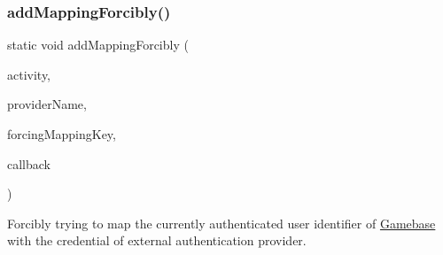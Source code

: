 \subsubsection{\texorpdfstring{add\+Mapping\+Forcibly()}{addMappingForcibly()}\hspace{0.1cm}{\footnotesize\ttfamily [1/3]}}
{\footnotesize\ttfamily static void add\+Mapping\+Forcibly (\begin{DoxyParamCaption}\item[{@Non\+Null final Activity}]{activity,  }\item[{@Non\+Null final String}]{provider\+Name,  }\item[{@Non\+Null final String}]{forcing\+Mapping\+Key,  }\item[{@Nullable final \hyperlink{interfacecom_1_1toast_1_1android_1_1gamebase_1_1_gamebase_data_callback}{Gamebase\+Data\+Callback}$<$ \hyperlink{classcom_1_1toast_1_1android_1_1gamebase_1_1auth_1_1data_1_1_auth_token}{Auth\+Token} $>$}]{callback }\end{DoxyParamCaption})\hspace{0.3cm}{\ttfamily [static]}}



Forcibly trying to map the currently authenticated user identifier of \hyperlink{classcom_1_1toast_1_1android_1_1gamebase_1_1_gamebase}{Gamebase} with the credential of external authentication provider. 


